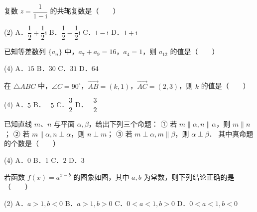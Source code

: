 

\begin{question}
复数 $z = \dfrac{1}{1-\mathrm{i}}$ 的共轭复数是\mbox{（　　）}

\begin{gkopts}(2)
\task A．$\dfrac{1}{2} + \dfrac{1}{2}\mathrm{i}$
\task B．$\dfrac{1}{2} - \dfrac{1}{2}\mathrm{i}$
\task C．$1 - \mathrm{i}$
\task D．$1 + \mathrm{i}$
\end{gkopts}

\end{question}
\begin{question}
已知等差数列 $\{a_n\}$ 中，$a_7 + a_9 = 16$，$a_4 = 1$，则 $a_{12}$ 的值是\mbox{（　　）}

\begin{gkopts}(4)
\task A．$15$
\task B．$30$
\task C．$31$
\task D．$64$
\end{gkopts}

\end{question}
\begin{question}
在 $\triangle ABC$ 中，$\angle C = 90^\circ$，$\overrightarrow{AB} = (k, 1)$，$\overrightarrow{AC} = (2, 3)$，则 $k$ 的值是\mbox{（　　）}

\begin{gkopts}(4)
\task A．$5$
\task B．$-5$
\task C．$\dfrac{3}{2}$
\task D．$-\dfrac{3}{2}$
\end{gkopts}

\end{question}
\begin{question}
已知直线 $m$、$n$ 与平面 $\alpha, \beta$，给出下列三个命题：
① 若 $m \parallel \alpha, n \parallel \alpha$，则 $m \parallel n$；
② 若 $m \parallel \alpha, n \perp \alpha$，则 $n \perp m$；
③ 若 $m \perp \alpha, m \parallel \beta$，则 $\alpha \perp \beta$．
其中真命题的个数是\mbox{（　　）}

\begin{gkopts}(4)
\task A．$0$
\task B．$1$
\task C．$2$
\task D．$3$
\end{gkopts}

\Needspace{0.4\textheight}
\end{question}
\begin{question}
若函数 $f(x) = a^{x-b}$ 的图象如图，其中 $a, b$ 为常数，则下列结论正确的是\mbox{（　　）}
\nopagebreak[4]
\begin{center}\end{center}
\nopagebreak[4]
\begin{gkopts}(2)
\task A．$a > 1, b < 0$
\task B．$a > 1, b > 0$
\task C．$0 < a < 1, b > 0$
\task D．$0 < a < 1, b < 0$
\end{gkopts}

\Needspace{0.4\textheight}
\end{question}
